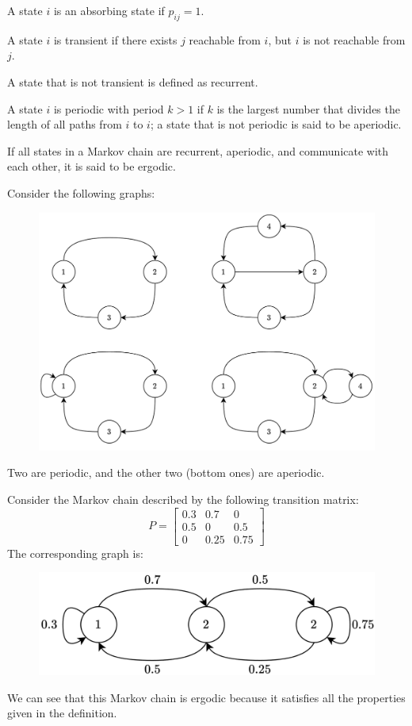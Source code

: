 \begin{definition}
    A state $i$ is an absorbing state if $p_{ij} = 1$.
\end{definition}
\begin{definition}
    A state $i$ is transient if there exists $j$ reachable from $i$, but $i$ is not reachable from $j$.
\end{definition}
\begin{definition}
    A state that is not transient is defined as recurrent.
\end{definition}
\begin{definition}
    A state $i$ is periodic with period $k > 1$ if $k$ is the largest number that divides the length of all paths from $i$ to $i$; a state that is not periodic is said to be aperiodic.
\end{definition}
\begin{definition}
    If all states in a Markov chain are recurrent, aperiodic, and communicate with each other, it is said to be ergodic.
\end{definition}
\begin{example}
    Consider the following graphs: 
    \begin{figure}[H]
        \centering
        \includegraphics[width=0.5\linewidth]{images/period.png}
    \end{figure}
    Two are periodic, and the other two (bottom ones) are aperiodic.

    Consider the Markov chain described by the following transition matrix:
    \[P= 
    \begin{bmatrix}
        0.3 & 0.7 & 0 \\
        0.5 & 0 & 0.5 \\ 
        0 & 0.25 & 0.75
    \end{bmatrix}\]
    The corresponding graph is: 
    \begin{figure}[H]
        \centering
        \includegraphics[width=0.5\linewidth]{images/ergo.png}
    \end{figure}
    We can see that this Markov chain is ergodic because it satisfies all the properties given in the definition.
\end{example}

